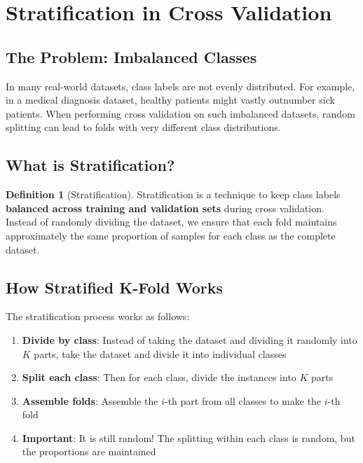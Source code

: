 \documentclass[11pt,a4paper]{article}
\theoremstyle{definition}
\newtheorem{definition}{Definition}[section]
\theoremstyle{plain}
\theoremstyle{remark}
\begin{document}
\section{Stratification in Cross Validation}

\subsection{The Problem: Imbalanced Classes}

In many real-world datasets, class labels are not evenly distributed. For example, in a medical diagnosis dataset, healthy patients might vastly outnumber sick patients. When performing cross validation on such imbalanced datasets, random splitting can lead to folds with very different class distributions.

\subsection{What is Stratification?}

\begin{definition}[Stratification]
Stratification is a technique to keep class labels \textbf{balanced across training and validation sets} during cross validation. Instead of randomly dividing the dataset, we ensure that each fold maintains approximately the same proportion of samples for each class as the complete dataset.
\end{definition}

\subsection{How Stratified K-Fold Works}

The stratification process works as follows:

\begin{enumerate}
    \item \textbf{Divide by class}: Instead of taking the dataset and dividing it randomly into $K$ parts, take the dataset and divide it into individual classes
    
    \item \textbf{Split each class}: Then for each class, divide the instances into $K$ parts
    
    \item \textbf{Assemble folds}: Assemble the $i$-th part from all classes to make the $i$-th fold
    
    \item \textbf{Important}: It is still random! The splitting within each class is random, but the proportions are maintained
\end{enumerate}
\end{document}
